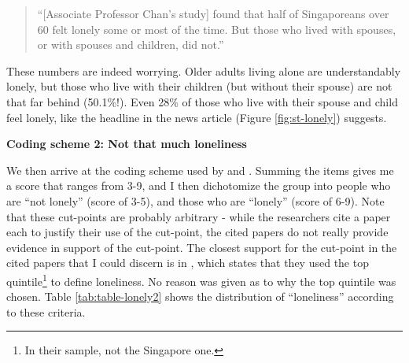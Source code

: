 \documentclass[openany]{book}
\let\rmarkdownfootnote\footnote%
\def\footnote{\protect\rmarkdownfootnote}
\begin{document}
\begin{quote}
``{[}Associate Professor Chan's study{]} found that half of Singaporeans
over 60 felt lonely some or most of the time. But those who lived with
spouses, or with spouses and children, did not.''
\end{quote}

 These numbers are indeed worrying. Older adults living alone are
understandably lonely, but those who live with their children (but
without their spouse) are not that far behind (50.1\%!). Even 28\% of
those who live with their spouse and child feel lonely, like the
headline in the news article (Figure \ref{fig:st-lonely}) suggests.

\textbf{Coding scheme 2: Not that much loneliness}

We then arrive at the coding scheme used by \citet{wee_loneliness_2019}
and \citet{ge_social_2017}. Summing the items gives me a score that
ranges from 3-9, and I then dichotomize the group into people who are
``not lonely'' (score of 3-5), and those who are ``lonely'' (score of
6-9). Note that these cut-points are probably arbitrary - while the
researchers cite a paper each to justify their use of the cut-point, the
cited papers do not really provide evidence in support of the cut-point.
The closest support for the cut-point in the cited papers that I could
discern is in \citet{steptoe_social_2013}, which states that they used
the top quintile\footnote{In their sample, not the Singapore one.} to
define loneliness. No reason was given as to why the top quintile was
chosen. Table \ref{tab:table-lonely2} shows the distribution of
``loneliness'' according to these criteria.
\end{document}
